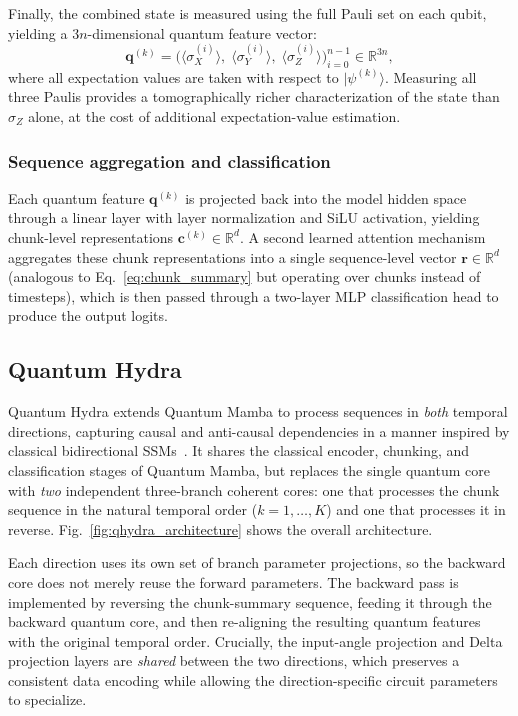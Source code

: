 Finally, the combined state is measured using the full Pauli set on each qubit, yielding a $3n$-dimensional quantum feature vector:
\begin{equation}
    \mathbf{q}^{(k)} = \Big(\langle\sigma_X^{(i)}\rangle,\; \langle\sigma_Y^{(i)}\rangle,\; \langle\sigma_Z^{(i)}\rangle\Big)_{i=0}^{n-1} \in \mathbb{R}^{3n},
    \label{eq:measurement}
\end{equation}
where all expectation values are taken with respect to $|\psi^{(k)}\rangle$.
Measuring all three Paulis provides a tomographically richer characterization of the state than $\sigma_Z$ alone, at the cost of additional expectation-value estimation.

\subsubsection{Sequence aggregation and classification}
Each quantum feature $\mathbf{q}^{(k)}$ is projected back into the model hidden space through a linear layer with layer normalization and SiLU activation, yielding chunk-level representations $\mathbf{c}^{(k)} \in \mathbb{R}^{d}$.
A second learned attention mechanism aggregates these chunk representations into a single sequence-level vector $\mathbf{r} \in \mathbb{R}^{d}$ (analogous to Eq.~\eqref{eq:chunk_summary} but operating over chunks instead of timesteps), which is then passed through a two-layer MLP classification head to produce the output logits.

\subsection{Quantum Hydra}
\label{sec:quantum_hydra}

Quantum Hydra extends Quantum Mamba to process sequences in \emph{both} temporal directions, capturing causal and anti-causal dependencies in a manner inspired by classical bidirectional SSMs~\cite{hydra2024}.
It shares the classical encoder, chunking, and classification stages of Quantum Mamba, but replaces the single quantum core with \emph{two} independent three-branch coherent cores: one that processes the chunk sequence in the natural temporal order ($k = 1, \ldots, K$) and one that processes it in reverse.
Fig.~\ref{fig:qhydra_architecture} shows the overall architecture.

Each direction uses its own set of branch parameter projections, so the backward core does not merely reuse the forward parameters.
The backward pass is implemented by reversing the chunk-summary sequence, feeding it through the backward quantum core, and then re-aligning the resulting quantum features with the original temporal order.
Crucially, the input-angle projection and Delta projection layers are \emph{shared} between the two directions, which preserves a consistent data encoding while allowing the direction-specific circuit parameters to specialize.

